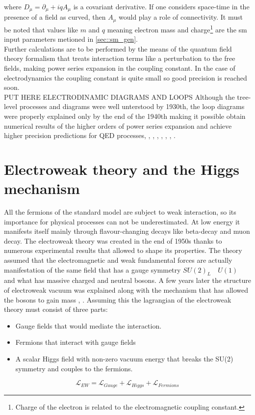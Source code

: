 where $D_{\mu} = \partial_{\mu}+iqA_{\mu}$ is a covariant derivative. If one considers space-time in the presence of a field as curved, then $A_{\mu}$ would play a role of connectivity. It must be noted that values like $m$ and $q$ meaning electron mass and charge\footnote{Charge of the electron is related to the electromagnetic coupling constant.} are the \gls{sm} input parameters metioned in \ref{sec::sm_gen}.  \\
Further calculations are to be performed by the means of the quantum field theory formalism that treats interaction terms like a perturbation to the free fields, making power series expansion in the coupling constant. In the case of electrodynamics the coupling constant is quite small so good precision is reached soon. \\
\large{PUT HERE ELECTRODINAMIC DIAGRAMS AND LOOPS}
Although the tree-level processes and diagrams were well unterstood by 1930th, the loop diagrams were properly explained only by the end of the 1940th making it possible obtain numerical results of the higher orders of power series expansion and achieve higher precision predictions for QED processes\cite{Schwinger_covar}, \cite{Schwinger_polariz}, \cite{Feynman_math}, \cite{Feynman_positrons}, \cite{Feynman_spacetime}, \cite{Tomonaga}, \cite{Dyson_all}, \cite{Dyson_smatr}. 
\section{Electroweak theory and the Higgs mechanism}
All the fermions of the standard model are subject to weak interaction, so its importance for physical processes can not be underestimated. At low energy it manifests itself mainly through flavour-changing decays like beta-decay and muon decay. The electroweak theory was created in the end of 1950s\cite{Glashow:1959wxa}\cite{weinberg}\cite{Salam1959} thanks to numerous experimental results that allowed to shape its properties. The theory assumed that the electromagnetic and weak fundamental forces are actually manifestation of the same field that has a gauge symmetry $SU(2)_L \quad U(1)$ and what has massive charged and neutral bosons. A few years later the structure of electroweak vacuum was explained along with the mechanism that has allowed the bosons to gain mass \cite{brout}, \cite{higgs}. Assuming this the lagrangian of the electroweak theory must consist of three parts\cite{Hollik_2006}: 
\begin{itemize}
	\item Gauge fields that would mediate the interaction.
	\item Fermions that interact with gauge fields
	\item A scalar Higgs field with non-zero vacuum energy that breaks the SU(2) symmetry and couples to the fermions.
\end{itemize}
 \begin{equation}
\mathcal{L}_{EW} = \mathcal{L}_{Gauge} +\mathcal{L}_{Higgs} +\mathcal{L}_{Fermions}
\end{equation}
